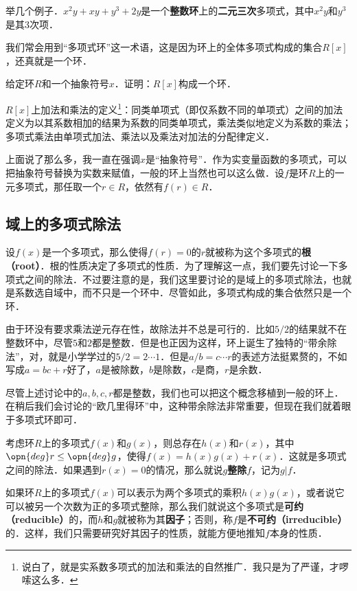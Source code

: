 举几个例子．$x^2y+xy+y^3+2y$是一个\textbf{整数环}上的\textbf{二元三次}多项式，其中$x^2y$和$y^3$是其$3$次项．

我们常会用到“多项式环”这一术语，这是因为环上的全体多项式构成的集合$R[x]$，还真就是一个环．

\begin{exercise}{}
给定环$R$和一个抽象符号$x$．证明：$R[x]$构成一个环．

$R[x]$上加法和乘法的定义\footnote{说白了，就是实系数多项式的加法和乘法的自然推广．我只是为了严谨，才啰嗦这么多．}：同类单项式（即仅系数不同的单项式）之间的加法定义为以其系数相加的结果为系数的同类单项式，乘法类似地定义为系数的乘法；多项式乘法由单项式加法、乘法以及乘法对加法的分配律定义．
\end{exercise}

上面说了那么多，我一直在强调$x$是“抽象符号”．作为实变量函数的多项式，可以把抽象符号替换为实数来赋值，一般的环上当然也可以这么做．设$f$是环$R$上的一元多项式，那任取一个$r\in R$，依然有$f(r)\in R$．




\subsection{域上的多项式除法}

设$f(x)$是一个多项式，那么使得$f(r)=0$的$r$就被称为这个多项式的\textbf{根（root）}．根的性质决定了多项式的性质．为了理解这一点，我们要先讨论一下多项式之间的除法．不过要注意的是，我们这里要讨论的是域上的多项式除法，也就是系数选自域中，而不只是一个环中．尽管如此，多项式构成的集合依然只是一个环．

由于环没有要求乘法逆元存在性，故除法并不总是可行的．比如$5/2$的结果就不在整数环中，尽管$5$和$2$都是整数．但是也正因为这样，环上诞生了独特的“带余除法”，对，就是小学学过的$5/2=2\cdots 1$．但是$a/b=c\cdots r$的表述方法挺累赘的，不如写成$a=bc+r$好了，$a$是被除数，$b$是除数，$c$是商，$r$是余数．

尽管上述讨论中的$a, b, c, r$都是整数，我们也可以把这个概念移植到一般的环上．在稍后我们会讨论的“欧几里得环”中，这种带余除法非常重要，但现在我们就着眼于多项式环即可．

考虑环$R$上的多项式$f(x)$和$g(x)$，则总存在$h(x)$和$r(x)$，其中$\opn{deg}r\leq\opn{deg}g$，使得$f(x)=h(x)g(x)+r(x)$．这就是多项式之间的除法．如果遇到$r(x)=0$的情况，那么就说$g$\textbf{整除}$f$，记为$g|f$．

如果环$R$上的多项式$f(x)$可以表示为两个多项式的乘积$h(x)g(x)$，或者说它可以被另一个次数为正的多项式整除，那么我们就说这个多项式是\textbf{可约（reducible）}的，而$h$和$g$就被称为其\textbf{因子}；否则，称$f$是\textbf{不可约（irreducible）}的．这样，我们只需要研究好其因子的性质，就能方便地推知$f$本身的性质．

